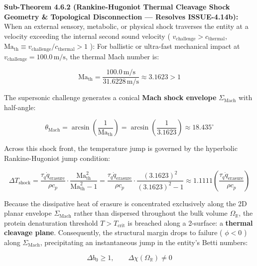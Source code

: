 \documentclass[11pt,a4paper]{article}
\theoremstyle{definition}
\theoremstyle{remark}
\begin{document}
\textbf{Sub-Theorem 4.6.2 (Rankine-Hugoniot Thermal Cleavage Shock Geometry \& Topological Disconnection — Resolves ISSUE-4.14b):}
When an external sensory, metabolic, or physical shock traverses the entity at a velocity exceeding the internal second sound velocity ( $v_{\text{challenge}} > c_{\text{thermal}}$, $\mathrm{Ma}_{\text{th}} \equiv v_{\text{challenge}} / c_{\text{thermal}} > 1$ ):
For ballistic or ultra-fast mechanical impact at $v_{\text{challenge}} = 100.0\,\mathrm{m/s}$, the thermal Mach number is:


\begin{equation}
\mathrm{Ma}_{\text{th}} = \frac{100.0\,\mathrm{m/s}}{31.6228\,\mathrm{m/s}} \approx 3.1623 > 1
\end{equation}


The supersonic challenge generates a conical \textbf{Mach shock envelope} $\Sigma_{\text{Mach}}$ with half-angle:


\begin{equation}
\theta_{\text{Mach}} = \arcsin\left( \frac{1}{\mathrm{Ma}_{\text{th}}} \right) = \arcsin\left( \frac{1}{3.1623} \right) \approx 18.435^\circ
\end{equation}


Across this shock front, the temperature jump is governed by the hyperbolic Rankine-Hugoniot jump condition:


\begin{equation}
\boxed{\Delta T_{\text{shock}} = \frac{\tau_q \dot{q}_{\text{erasure}}}{\rho c_p} \cdot \frac{\mathrm{Ma}_{\text{th}}^2}{\mathrm{Ma}_{\text{th}}^2 - 1} = \frac{\tau_q \dot{q}_{\text{erasure}}}{\rho c_p} \cdot \frac{(3.1623)^2}{(3.1623)^2 - 1} \approx 1.1111 \left( \frac{\tau_q \dot{q}_{\text{erasure}}}{\rho c_p} \right)}
\end{equation}


Because the dissipative heat of erasure is concentrated exclusively along the 2D planar envelope $\Sigma_{\text{Mach}}$ rather than dispersed throughout the bulk volume $\Omega_{\mathbb{R}}$, the protein denaturation threshold $T > T_{\text{crit}}$ is breached along a 2-surface: a \textbf{thermal cleavage plane}.
Consequently, the structural margin drops to failure ( $\phi < 0$ ) along $\Sigma_{\text{Mach}}$, precipitating an instantaneous jump in the entity's Betti numbers:


\begin{equation}
\Delta b_0 \ge 1, \qquad \Delta \chi(\Omega_{\mathbb{R}}) \neq 0
\end{equation}
\end{document}
